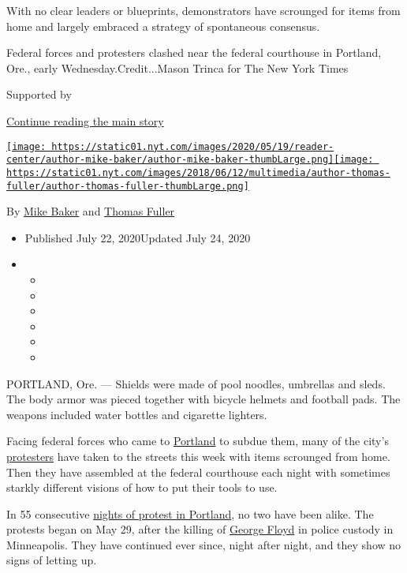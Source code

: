 With no clear leaders or blueprints, demonstrators have scrounged for
items from home and largely embraced a strategy of spontaneous
consensus.

Federal forces and protesters clashed near the federal courthouse in
Portland, Ore., early Wednesday.Credit...Mason Trinca for The New York
Times

Supported by

\protect\hyperlink{after-sponsor}{Continue reading the main story}

\href{https://www.nytimes.com/by/mike-baker}{\texttt{[image: https://static01.nyt.com/images/2020/05/19/reader-center/author-mike-baker/author-mike-baker-thumbLarge.png]}}\href{https://www.nytimes.com/by/thomas-fuller}{\texttt{[image: https://static01.nyt.com/images/2018/06/12/multimedia/author-thomas-fuller/author-thomas-fuller-thumbLarge.png]}}

By \href{https://www.nytimes.com/by/mike-baker}{Mike Baker} and
\href{https://www.nytimes.com/by/thomas-fuller}{Thomas Fuller}

\begin{itemize}
\item
  Published July 22, 2020Updated July 24, 2020
\item
  \begin{itemize}
  \item
  \item
  \item
  \item
  \item
  \item
  \end{itemize}
\end{itemize}

PORTLAND, Ore. --- Shields were made of pool noodles, umbrellas and
sleds. The body armor was pieced together with bicycle helmets and
football pads. The weapons included water bottles and cigarette
lighters.

Facing federal forces who came to
\href{https://www.nytimes.com/article/portland-protests-explained-protesters.html}{Portland}
to subdue them, many of the city's
\href{https://www.nytimes.com/interactive/2020/07/22/us/portland-protests.html}{protesters}
have taken to the streets this week with items scrounged from home. Then
they have assembled at the federal courthouse each night with sometimes
starkly different visions of how to put their tools to use.

In 55 consecutive
\href{https://www.nytimes.com/2020/07/23/upshot/trump-portland.html}{nights
of protest in Portland}, no two have been alike. The protests began on
May 29, after the killing of
\href{https://www.nytimes.com/article/george-floyd-who-is.html}{George
Floyd} in police custody in Minneapolis. They have continued ever since,
night after night, and they show no signs of letting up.

